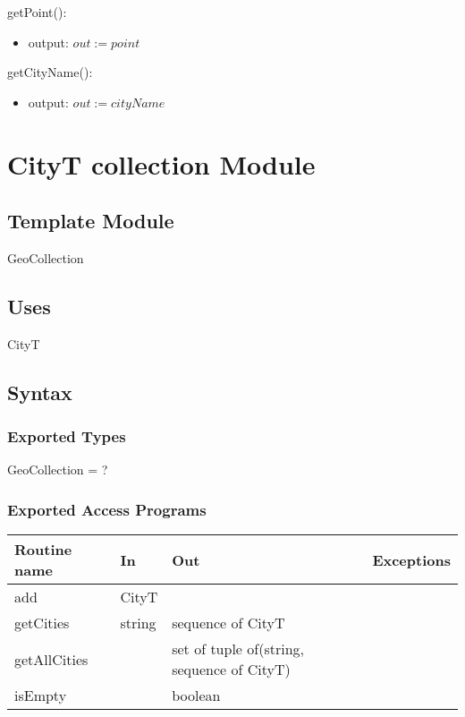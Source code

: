 \documentclass[12pt]{article}
\begin{document}
\noindent getPoint():
\begin{itemize}
\item output: $\mathit{out} := point$ 
\end{itemize}

\noindent getCityName():
\begin{itemize}
\item output: $\mathit{out} := cityName$
\end{itemize}





\newpage

\section* { CityT collection Module}

\subsection* {Template Module}

GeoCollection

\subsection* {Uses}

CityT

\subsection* {Syntax}

\subsubsection* {Exported Types}

GeoCollection = ?


\subsubsection* {Exported Access Programs}

\begin{tabular}{| l | l | l | p{6cm} |}
\hline
\textbf{Routine name} & \textbf{In} & \textbf{Out} & \textbf{Exceptions}\\
\hline
add & CityT &  & \\
\hline
getCities & string & sequence of CityT & \\
\hline
getAllCities &  & set of tuple of(string, sequence of CityT)& \\
\hline
isEmpty &  & boolean& \\
\hline
\end{tabular}
\end{document}
